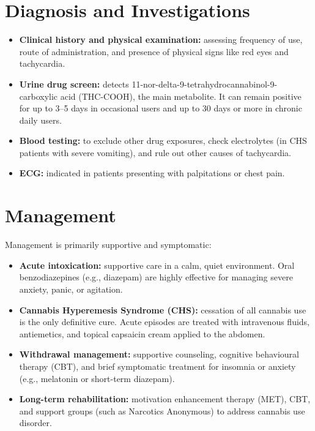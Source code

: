 \section*{Diagnosis and Investigations}
\begin{itemize}
    \item \textbf{Clinical history and physical examination:} assessing frequency of use, route of administration, and presence of physical signs like red eyes and tachycardia.
    \item \textbf{Urine drug screen:} detects 11-nor-delta-9-tetrahydrocannabinol-9-carboxylic acid (THC-COOH), the main metabolite. It can remain positive for up to 3--5 days in occasional users and up to 30 days or more in chronic daily users.
    \item \textbf{Blood testing:} to exclude other drug exposures, check electrolytes (in CHS patients with severe vomiting), and rule out other causes of tachycardia.
    \item \textbf{ECG:} indicated in patients presenting with palpitations or chest pain.
\end{itemize}

\section*{Management}
Management is primarily supportive and symptomatic:

\begin{itemize}
    \item \textbf{Acute intoxication:} supportive care in a calm, quiet environment. Oral benzodiazepines (e.g., diazepam) are highly effective for managing severe anxiety, panic, or agitation.
    \item \textbf{Cannabis Hyperemesis Syndrome (CHS):} cessation of all cannabis use is the only definitive cure. Acute episodes are treated with intravenous fluids, antiemetics, and topical capsaicin cream applied to the abdomen.
    \item \textbf{Withdrawal management:} supportive counseling, cognitive behavioural therapy (CBT), and brief symptomatic treatment for insomnia or anxiety (e.g., melatonin or short-term diazepam).
    \item \textbf{Long-term rehabilitation:} motivation enhancement therapy (MET), CBT, and support groups (such as Narcotics Anonymous) to address cannabis use disorder.
\end{itemize}

